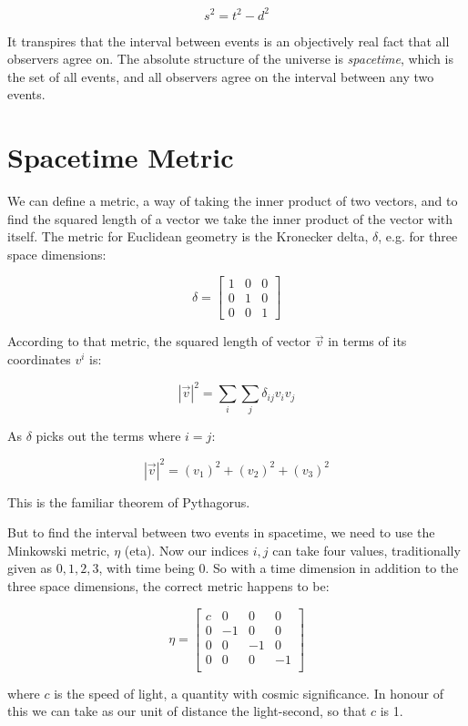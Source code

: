 $$s^2 = t^2 - d^2$$

It transpires that the interval between events is an objectively real fact that all observers agree on. The absolute structure of the universe is \textit{spacetime}, which is the set of all events, and all observers agree on the interval between any two events.

\section{Spacetime Metric}

We can define a metric, a way of taking the inner product of two vectors, and to find the squared length of a vector we take the inner product of the vector with itself. The metric for Euclidean geometry is the Kronecker delta, $\delta$, e.g. for three space dimensions:

$$
\delta =
\begin{bmatrix}
1 & 0 & 0 \\
0 & 1 & 0 \\
0 & 0 & 1
\end{bmatrix}
$$

According to that metric, the squared length of vector $\vec{v}$ in terms of its coordinates $v^i$ is:

$$|\vec{v}|^2 = \sum_i \sum_j \delta_{ij}v_iv_j$$

As $\delta$ picks out the terms where $i = j$:

$$|\vec{v}|^2 = (v_1)^2 + (v_2)^2 + (v_3)^2$$

This is the familiar theorem of Pythagorus.

But to find the interval between two events in spacetime, we need to use the Minkowski metric, $\eta$ (eta). Now our indices $i, j$ can take four values, traditionally given as $0, 1, 2, 3$, with time being $0$. So with a time dimension in addition to the three space dimensions, the correct metric happens to be:

$$
\eta =
\begin{bmatrix}
c & 0 & 0 & 0 \\
0 & -1 & 0 & 0 \\
0 & 0 & -1 & 0 \\
0 & 0 & 0 & -1 \\
\end{bmatrix}
$$

where $c$ is the speed of light, a quantity with cosmic significance. In honour of this we can take as our unit of distance the light-second, so that $c$ is 1.

